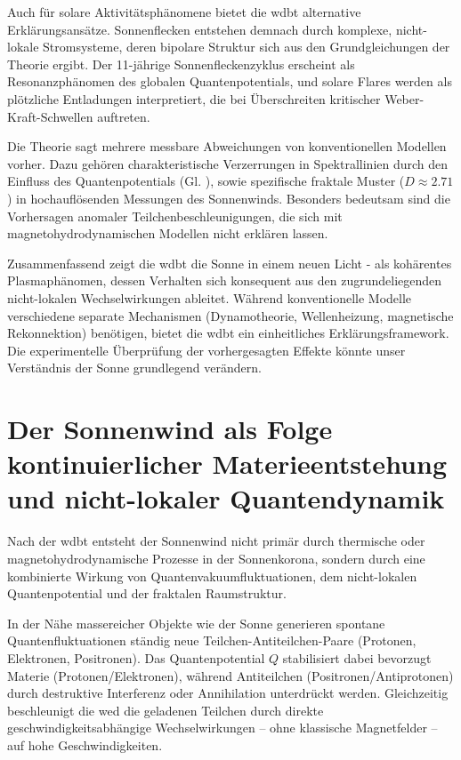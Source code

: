 Auch für solare Aktivitätsphänomene bietet die \gls{wdbt} alternative Erklärungsansätze. Sonnenflecken entstehen demnach durch komplexe, nicht-lokale Stromsysteme, deren bipolare
Struktur sich aus den Grundgleichungen der Theorie ergibt. Der 11-jährige Sonnenfleckenzyklus erscheint als Resonanzphänomen des globalen Quantenpotentials, und solare Flares
werden als plötzliche Entladungen interpretiert, die bei Überschreiten kritischer Weber-Kraft-Schwellen auftreten.

Die Theorie sagt mehrere messbare Abweichungen von konventionellen Modellen vorher. Dazu gehören charakteristische Verzerrungen in Spektrallinien durch den Einfluss des
Quantenpotentials (Gl. ), sowie spezifische fraktale Muster ($D \approx 2.71$) in hochauflösenden Messungen des Sonnenwinds. Besonders bedeutsam sind die Vorhersagen anomaler
Teilchenbeschleunigungen, die sich mit magnetohydrodynamischen Modellen nicht erklären lassen.

Zusammenfassend zeigt die \gls{wdbt} die Sonne in einem neuen Licht - als kohärentes Plasmaphänomen, dessen Verhalten sich konsequent aus den zugrundeliegenden nicht-lokalen
Wechselwirkungen ableitet. Während konventionelle Modelle verschiedene separate Mechanismen (Dynamotheorie, Wellenheizung, magnetische Rekonnektion) benötigen, bietet die \gls{wdbt}
ein einheitliches Erklärungsframework. Die experimentelle Überprüfung der vorhergesagten Effekte könnte unser Verständnis der Sonne grundlegend verändern.

\section{Der Sonnenwind als Folge kontinuierlicher Materieentstehung und nicht-lokaler Quantendynamik}
Nach der \gls{wdbt} entsteht der Sonnenwind nicht primär durch thermische oder magnetohydrodynamische Prozesse in der Sonnenkorona, sondern durch eine kombinierte Wirkung von
Quantenvakuumfluktuationen, dem nicht-lokalen Quantenpotential und der fraktalen Raumstruktur.

In der Nähe massereicher Objekte wie der Sonne generieren spontane Quantenfluktuationen ständig neue Teilchen-Antiteilchen-Paare (Protonen, Elektronen, Positronen). Das Quantenpotential $Q$ stabilisiert
dabei bevorzugt Materie (Protonen/Elektronen), während Antiteilchen (Positronen/Antiprotonen) durch destruktive Interferenz oder Annihilation unterdrückt werden. Gleichzeitig
beschleunigt die \gls{wed} die geladenen Teilchen durch direkte geschwindigkeitsabhängige Wechselwirkungen – ohne klassische Magnetfelder – auf hohe Geschwindigkeiten.

